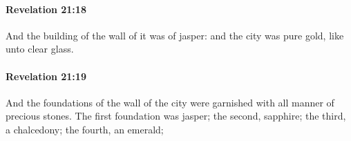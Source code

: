 		\paragraph{Revelation 21:18} %
			\label{REVELATIONNT-21-18}

			And the building of the wall of it was of jasper: and the city was pure gold, like unto clear glass.

			\begin{framed}
			\scriptsize
				\begin{compactdesc}
					\item[SBLG] 
				\end{compactdesc}
			\end{framed}

		\paragraph{Revelation 21:19} %
			\label{REVELATIONNT-21-19}

			And the foundations of the wall of the city were garnished with all manner of precious stones. The first foundation was jasper; the second, sapphire; the third, a chalcedony; the fourth, an emerald;

